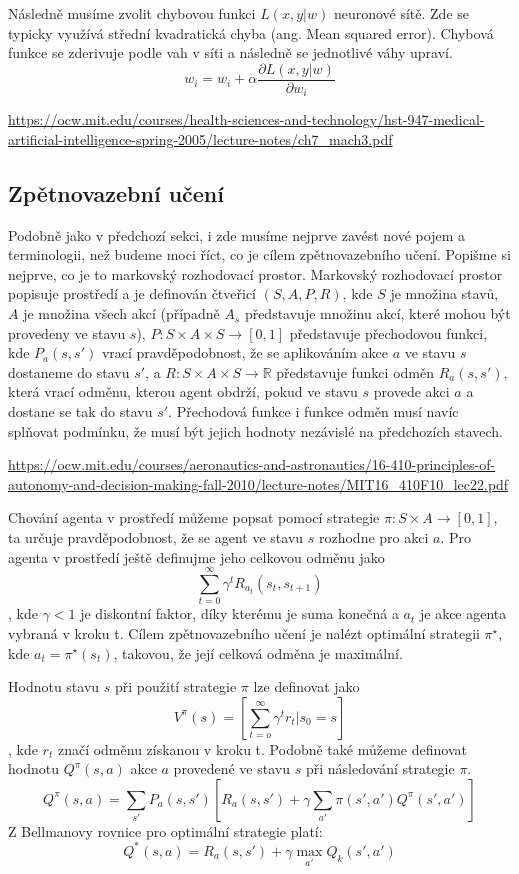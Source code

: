 Následně musíme zvolit chybovou funkci $L(x,y|w)$ neuronové sítě. Zde se typicky využívá střední kvadratická chyba (ang. Mean squared error).
Chybová funkce se zderivuje podle vah v síti a následně se jednotlivé váhy upraví.
\newline
\[w_i = w_i + \alpha\frac{\partial L(x,y|w)}{\partial w_i}\]

\url{https://ocw.mit.edu/courses/health-sciences-and-technology/hst-947-medical-artificial-intelligence-spring-2005/lecture-notes/ch7_mach3.pdf}

\subsection{Zpětnovazební učení}
Podobně jako v předchozí sekci, i zde musíme nejprve zavést nové pojem a terminologii, než budeme moci říct, co je cílem zpětnovazebního učení.
Popišme si nejprve, co je to markovský rozhodovací prostor.
Markovský rozhodovací prostor popisuje prostředí a je definován čtveřicí $(S,A,P,R)$, kde $S$ je množina stavů, $A$ je množina všech akcí (případně $A_s$ představuje množinu akcí, které mohou být provedeny ve stavu $s$), 
$P: S \times A \times S \rightarrow [0,1]$ představuje přechodovou funkci, 
kde $P_a(s,s')$ vrací pravděpodobnost, že se aplikováním akce $a$ ve stavu $s$ dostaneme do stavu $s'$, 
a $R: S \times A \times S \rightarrow \mathbb{R}$ představuje funkci odměn $R_a(s,s')$, která vrací odměnu, kterou agent obdrží, pokud ve stavu $s$ provede akci $a$ a dostane se tak do stavu $s'$.
Přechodová funkce i funkce odměn musí navíc splňovat podmínku, že musí být jejich hodnoty nezávislé na předchozích stavech.

\url{https://ocw.mit.edu/courses/aeronautics-and-astronautics/16-410-principles-of-autonomy-and-decision-making-fall-2010/lecture-notes/MIT16_410F10_lec22.pdf}

Chování agenta v prostředí můžeme popsat pomocí strategie $\pi: S \times A \rightarrow [0,1]$, ta určuje pravděpodobnost, že se agent ve stavu $s$ rozhodne pro akci $a$.
Pro agenta v prostředí ještě definujme jeho celkovou odměnu jako \[\sum_{t=0}^{\infty} \gamma^tR_{a_t}(s_t,s_{t+1})\], kde $\gamma<1$ je diskontní faktor, díky kterému je suma konečná a $a_t$ je akce agenta vybraná v kroku t.
Cílem zpětnovazebního učení je nalézt optimální strategii $\pi^\star$, kde $a_t=\pi^\star(s_t)$, takovou, že její celková odměna je maximální.

Hodnotu stavu $s$ při použití strategie $\pi$ lze definovat jako 
\newline
\[V^{\pi}(s)=[\sum_{t=o}^{\infty} \gamma^tr_t|s_0=s]\], kde $r_t$ značí odměnu získanou v kroku t.
Podobně také můžeme definovat hodnotu $Q^{\pi}(s,a)$ akce $a$ provedené ve stavu $s$ při následování strategie $\pi$.
\[Q^\pi(s,a)=\sum_{s'}P_a(s,s')[R_a(s,s') + \gamma\sum_{a'} \pi(s',a')Q^\pi(s',a')]\]
Z Bellmanovy rovnice pro optimální strategie platí:
\[Q^*(s,a)=R_a(s,s') + \gamma\max_{a'}Q_k(s',a')\]

